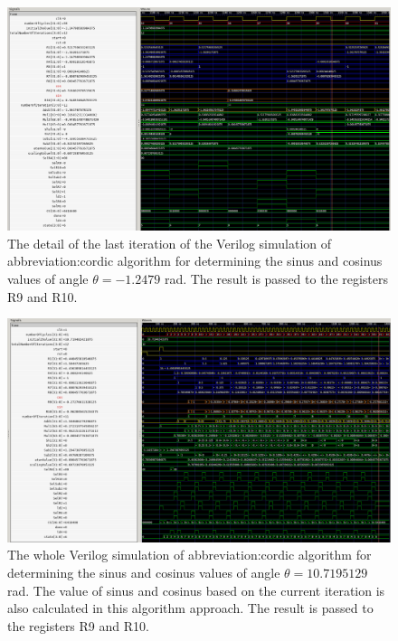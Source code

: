 \documentclass[a4paper, twoside, 11pt]{article}
\begin{document}
        \begin{figure}[htbp!]
            \centering
            \includegraphics[width=1\textwidth]{src/png/cordic-verilog-end-of-the-simulation.png}
            \caption{The detail of the last iteration of the Verilog simulation of \gls{abbreviation:cordic} algorithm for determining the sinus and cosinus values of angle $\theta = -1.2479$ rad. The result is passed to the registers R9 and R10.}
            \label{fig:cordic-verilog-end-of-the-simulation}
        \end{figure}

        \begin{figure}[htbp!]
            \centering
            \includegraphics[width=1\textwidth]{src/png/cordic-verilog-whole-sim-10_719.png}
            \caption{The whole Verilog simulation of \gls{abbreviation:cordic} algorithm for determining the sinus and cosinus values of angle $\theta = 10.7195129$ rad. The value of sinus and cosinus based on the current iteration is also calculated in this algorithm approach. The result is passed to the registers R9 and R10.}
            \label{fig:cordic-verilog-whole-sim-10_719}
        \end{figure}
\end{document}

